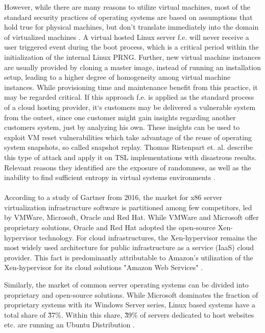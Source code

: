 However, while there are many reasons to utilize virtual machines, most of the standard security practices of operating systems are based on assumptions that hold true for physical machines, but don't translate immediately into the domain of virtualized machines \cite{kerrigan2012study}. A virtual hosted Linux server f.e. will never receive a user triggered event during the boot process, which is a critical period within the initialization of the internal Linux PRNG. Further, new virtual machine instances are usually provided by cloning a master image, instead of running an installation setup, leading to a higher degree of homogeneity among virtual machine instances. While provisioning time and maintenance benefit from this practice, it may be regarded critical. If this approach f.e. is applied as the standard process of a cloud hosting provider, it`s customers may be delivered a vulnerable system from the outset, since one customer might gain insights regarding another customers system, just by analyzing his own. These insights can be used to exploit VM reset vulnerabilities which take advantage of the reuse of  operating system snapshots, so called snapshot replay. Thomas Ristenpart et. al. describe this type of attack and apply it on TSL implementations with disastrous results. Relevant reasons they identified are the exposure of randomness, as well as the inability to find sufficient entropy in virtual systems environments \cite{ristenpart2010good, ristenpart2009hey}. \\~\\
According to a study of Gartner from 2016, the market for x86 server virtualization infrastructure software is partitioned among few competitors, led by VMWare, Microsoft, Oracle and Red Hat. While VMWare and Microsoft offer proprietary solutions, Oracle and Red Hat adopted the open-source Xen-hypervisor technology. For cloud infrastructures, the Xen-hypervisor remains the most widely used architecture for public infrastructure as a service (IaaS) cloud provider. This fact is predominantly attributable to Amazon's utilization of the Xen-hypervisor for its cloud solutions "Amazon Web Services" \cite{bittman2016magic}. 

Similarly, the market of common server operating systems can be divided into proprietary and open-source solutions. While Microsoft dominates the fraction of proprietary systems with its Windows Server series, Linux based systems have a total share of \~37\%. Within this share, \~39\% of servers dedicated to host websites etc. are running an Ubuntu Distribution \cite{statsharelinux} . \\~\\



